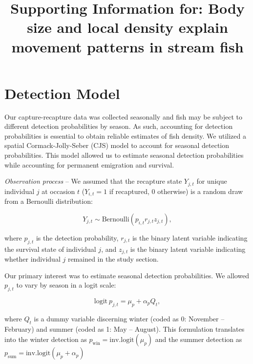 \documentclass[11pt, class=article, crop=false]{standalone}
\title{Supporting Information for: Body size and local density explain movement patterns in stream fish }
\date{} %
\author{}
\begin{document}
\renewcommand{\theequation}{S\arabic{equation}}
\renewcommand{\thetable}{S\arabic{table}}
\renewcommand{\thefigure}{S\arabic{figure}}

\maketitle

\tableofcontents

\newpage

\section{Detection Model}

Our capture-recapture data was collected seasonally and fish may be subject to different detection probabilities by season.
As such, accounting for detection probabilities is essential to obtain reliable estimates of fish density.
We utilized a spatial Cormack-Jolly-Seber (CJS) model \citep{schaubEstimatingTrueInstead2014} to account for seasonal detection probabilities. 
This model allowed us to estimate seasonal detection probabilities while accounting for permanent emigration and survival.

\textit{Observation process} -- 
We assumed that the recapture state $Y_{j,t}$ for unique individual $j$ at occasion $t$ ($Y_{i,t} = 1$ if recaptured, $0$ otherwise) is a random draw from a Bernoulli distribution:

\begin{equation}
    Y_{j,t} \sim \text{Bernoulli}(p_{i,t} r_{j, t} z_{j,t}),
\end{equation}

where $p_{j,t}$ is the detection probability, $r_{j, t}$ is the binary latent variable indicating the survival state of individual $j$, and $z_{j, t}$ is the binary latent variable indicating whether individual $j$ remained in the study section.

Our primary interest was to estimate seasonal detection probabilities.
We allowed $p_{j, t}$ to vary by season in a logit scale:

\begin{equation}
    \text{logit}~p_{j,t} = \mu_p + \alpha_p Q_{t},
\end{equation}

where $Q_{t}$ is a dummy variable discerning winter (coded as 0: November -- February) and summer (coded as 1: May -- August).
This formulation translates into the winter detection as $p_{\text{win}} = \text{inv.logit}(\mu_p)$ and the summer detection as $p_{\text{sum}} = \text{inv.logit}(\mu_p + \alpha_p)$
\end{document}
